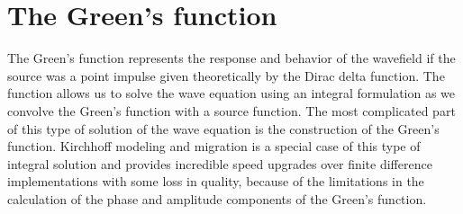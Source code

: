 \begin{comment}
Repeating this process for the second order formulation by differentiating equation~(\ref{eq:wavedld2}) twice, once with respect to $l$ and
once with respect to $x$ and adding the two yields:
\beqa
\frac{\partial^2 D_{xx}}{\partial x^2}+
\frac{\partial^2 D_{xx}}{\partial y^2} + \frac{\partial^2 D_{xx}}{\partial z^2} = w(x,y,z) \frac{\partial^2 D_{xx}}{\partial t^2}+f_{xx}(x,y,z,t),
\label{eq:wavedld3}
\eeqa
where
\beqa
f_{xx}(x,y,z,t) = 2 w(x,y,z) \frac{\partial^3 D_x}{\partial x \partial t^2}- 2
\frac{\partial}{\partial x} \left(\frac{\partial^2 D_x}{\partial x^2}+
\frac{\partial^2 D_x}{\partial y^2} + \frac{\partial^2 D_x}{\partial z^2} \right) \nonumber \\
+
w(x,y,z) \frac{\partial^4 u}{\partial x^2 \partial t^2}- \frac{\partial^2}{\partial x^2} \left(\frac{\partial^2 u}{\partial x^2}+
\frac{\partial^2 u}{\partial y^2} + \frac{\partial^2 u}{\partial z^2} \right).
\label{eq:wavef3}
\eeqa
Though $f_{xx}$ seems complicated many of its components are computed in the process of the conventional application of finite
difference to the wave equation or its first-order perturbation equation, and thus,
the computational cost is dramatically reduced. These equations, though do not include velocity derivatives explicitly, \geosout{they are} \geouline{have them} embedded in the extra derivative.
However, since we typically seek solutions that are based on functions that are infinitely differentiable (like the Fourier representation), the new formulations
can result in improvements in the prediction of the wavefield in complicated velocity models. \geouline{However, the new formulation
is moderately more expensive to implement than the original one, in which velocity derivatives are evaluated once. In the
new formulation, we evaluate the derivatives of the Laplacian of the background wavefield at each time step.}

\end{comment}


\section{The Green's function}

The Green's function represents the response and behavior of the wavefield if the source was a point impulse given theoretically by
the Dirac delta function. The function allows us to solve the wave equation using an integral formulation as we convolve the Green's function
with a source function. The most complicated part of this
type of solution of the wave equation is the construction of the Green's function. Kirchhoff modeling and migration is a special case of this type of integral
solution and provides incredible speed upgrades over finite difference implementations with some loss in quality, because of the limitations
in the calculation of the phase and amplitude components of the Green's function.

